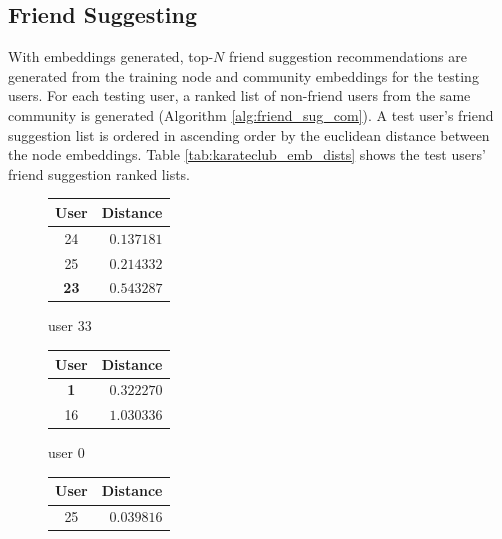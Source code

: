 \documentclass[conference]{IEEEtran}
\begin{document}
\subsection{Friend Suggesting}

With embeddings generated, top-$N$ friend suggestion recommendations are generated from the training node and community embeddings for the testing users. For each testing user, a ranked list of non-friend users from the same community is generated (Algorithm \ref{alg:friend_sug_com}). A test user's friend suggestion list is ordered in ascending order by the euclidean distance between the node embeddings. Table \ref{tab:karateclub_emb_dists} shows the test users' friend suggestion ranked lists.

\begin{table}
    \centering
    \caption{Testing users' friend suggestions ranked by node embedding distance.}
    \label{tab:karateclub_emb_dists}
    \begin{subfigure}{.4\textwidth}
        \centering
        \begin{tabular}{ c | r }
            User        & Distance   \\
            \hline
            \hline
            24          & $0.137181$ \\
            \hline
            25          & $0.214332$ \\
            \hline
            \textbf{23} & $0.543287$ \\
        \end{tabular}
        \caption{user 33}
    \end{subfigure}
    \begin{subfigure}{.4\textwidth}
        \centering
        \begin{tabular}{ c | r }
            User       & Distance   \\
            \hline
            \hline
            \textbf{1} & $0.322270$ \\
            \hline
            16         & $1.030336$ \\
        \end{tabular}
        \caption{user 0}
    \end{subfigure}
    \begin{subfigure}{.4\textwidth}
        \centering
        \begin{tabular}{ c | r }
            User        & Distance   \\
            \hline
            \hline
            25          & $0.039816$ \\

\end{tabular}
\end{subfigure}
\end{table}
\end{document}
